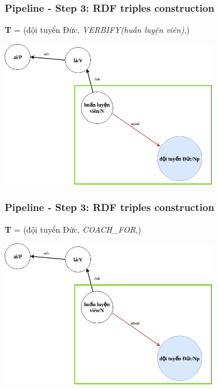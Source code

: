 \documentclass{beamer}
\begin{document}
\begin{frame}
	\frametitle{Pipeline - Step 3: RDF triples construction}
	\textbf{T} = (đội tuyển Đức, \textit{VERBIFY(huấn luyện viên)},)
	\begin{center} 
		\centering 
			\includegraphics[width=0.7\textwidth,height=0.7\textheight,keepaspectratio]			{firstextreesimplified3}
			\vspace{0.5cm} 
	\end{center}	
	
	
		
\end{frame}

\begin{frame}
	\frametitle{Pipeline - Step 3: RDF triples construction}
	
	\textbf{T} = (đội tuyển Đức, \textit{COACH\_FOR},)
	
	\begin{center} 
		\centering 
			\includegraphics[width=0.7\textwidth,height=0.7\textheight,keepaspectratio]			{firstextreesimplified3}
			\vspace{0.5cm} 
	\end{center}	

\end{frame}
\end{document}
